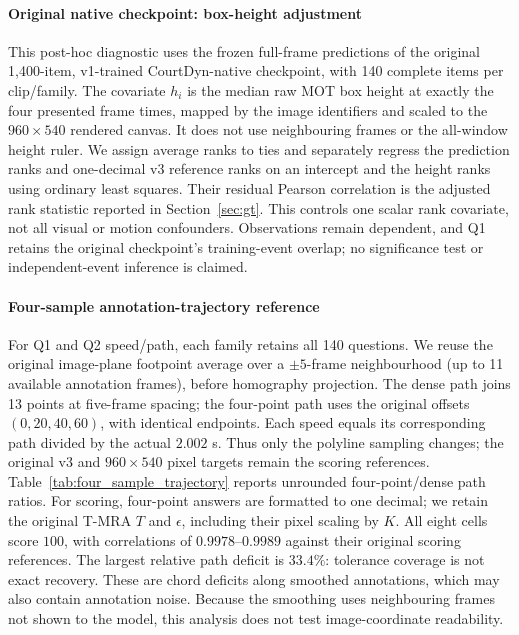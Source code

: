\documentclass[11pt]{article}
\begin{document}
\paragraph{Original native checkpoint: box-height adjustment}
\label{app:native_boxheight}
This post-hoc diagnostic uses the frozen full-frame predictions of the
original 1,400-item, v1-trained CourtDyn-native checkpoint, with 140 complete
items per clip/family. The covariate $h_i$ is the median raw MOT box height
at exactly the four presented frame times, mapped by the image identifiers
and scaled to the $960\times540$ rendered canvas. It does not use neighbouring
frames or the all-window height ruler. We assign average ranks to ties and
separately regress the prediction ranks and one-decimal v3 reference ranks
on an intercept and the height ranks using ordinary least squares. Their
residual Pearson correlation is the adjusted rank statistic reported in
Section~\ref{sec:gt}. This controls one scalar rank covariate, not all visual
or motion confounders. Observations remain dependent, and Q1 retains the
original checkpoint's training-event overlap; no significance test or
independent-event inference is claimed.

\paragraph{Four-sample annotation-trajectory reference}
\label{app:four_sample_trajectory}
For Q1 and Q2 speed/path, each family retains all 140 questions. We reuse the
original image-plane footpoint average over a $\pm5$-frame neighbourhood
(up to 11 available annotation frames), before homography projection. The dense path joins 13 points at five-frame spacing;
the four-point path uses the original offsets $(0,20,40,60)$, with identical
endpoints. Each speed equals its corresponding path divided by the actual
$2.002$ s. Thus only the polyline sampling changes; the original v3 and
$960\times540$ pixel targets remain the scoring references.
Table~\ref{tab:four_sample_trajectory} reports unrounded four-point/dense
path ratios. For scoring, four-point answers are formatted to one decimal;
we retain the original T-MRA $T$ and $\epsilon$, including their pixel
scaling by $K$. All eight cells score $100$, with correlations of
$0.9978$--$0.9989$ against their original scoring references. The largest
relative path deficit is $33.4\%$: tolerance coverage is not exact recovery.
These are chord deficits along smoothed annotations, which may also contain
annotation noise. Because the smoothing uses neighbouring frames not shown
to the model, this analysis does not test image-coordinate readability.
\end{document}
